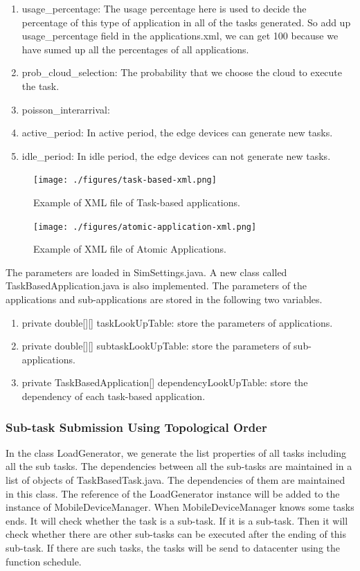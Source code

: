 \begin{enumerate}
	\item usage\_percentage: The usage percentage here is used to decide the percentage of this type of application in all of the tasks generated. So add up usage\_percentage field in the applications.xml, we can get 100 because we have sumed up all the percentages of all applications.
	\item prob\_cloud\_selection: The probability that we choose the cloud to execute the task.
	\item poisson\_interarrival:
	\item active\_period: In active period, the edge devices can generate new tasks.
	\item idle\_period: In idle period, the edge devices can not generate new tasks.
\end{enumerate}

\begin{figure}
	\centering
	\texttt{[image: ./figures/task-based-xml.png]}
	\caption{\label{fig:frog}Example of XML file of Task-based applications.}
\end{figure}

\begin{figure}
	\centering
	\texttt{[image: ./figures/atomic-application-xml.png]}
	\caption{\label{fig:frog}Example of XML file of Atomic Applications.}
\end{figure}

The parameters are loaded in SimSettings.java. A new class called TaskBasedApplication.java is also implemented. The parameters of the applications and sub-applications are stored in the following two variables.

\begin{enumerate}
	\item private double[][] taskLookUpTable: store the parameters of applications.
	\item private double[][] subtaskLookUpTable: store the parameters of sub-applications.
	\item private TaskBasedApplication[] dependencyLookUpTable: store the dependency of each task-based application.
\end{enumerate}



\subsubsection{Sub-task Submission Using Topological Order}
In the class LoadGenerator, we generate the list properties of all tasks including all the sub tasks. The dependencies between all the sub-tasks are maintained in a list of objects of TaskBasedTask.java. The dependencies of them are maintained in this class. The reference of the LoadGenerator instance will be added to the instance of MobileDeviceManager. When MobileDeviceManager knows some tasks ends. It will check whether the task is a sub-task. If it is a sub-task. Then it will check whether there are other sub-tasks can be executed after the ending of this sub-task. If there are such tasks, the tasks will be send to datacenter using the function schedule.

